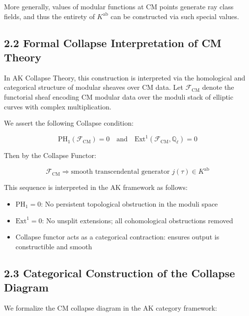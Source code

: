 \documentclass[11pt]{article}
\begin{document}
More generally, values of modular functions at CM points generate ray class fields, and thus the entirety of \( K^{\mathrm{ab}} \) can be constructed via such special values.

\subsection{2.2 Formal Collapse Interpretation of CM Theory}

In AK Collapse Theory, this construction is interpreted via the homological and categorical structure of modular sheaves over CM data. Let \( \mathcal{F}_{\mathrm{CM}} \) denote the functorial sheaf encoding CM modular data over the moduli stack of elliptic curves with complex multiplication.

We assert the following Collapse condition:

\[
\boxed{
\mathrm{PH}_1(\mathcal{F}_{\mathrm{CM}}) = 0 \quad \text{and} \quad \mathrm{Ext}^1(\mathcal{F}_{\mathrm{CM}}, \mathbb{Q}_\ell) = 0
}
\]

Then by the Collapse Functor:

\[
\mathcal{F}_{\mathrm{CM}} \Rightarrow \text{smooth transcendental generator } j(\tau) \in K^{\mathrm{ab}}
\]

This sequence is interpreted in the AK framework as follows:
\begin{itemize}
    \item \( \mathrm{PH}_1 = 0 \): No persistent topological obstruction in the moduli space
    \item \( \mathrm{Ext}^1 = 0 \): No unsplit extensions; all cohomological obstructions removed
    \item Collapse functor acts as a categorical contraction: ensures output is constructible and smooth
\end{itemize}

\subsection{2.3 Categorical Construction of the Collapse Diagram}
\label{subsec:categorical-collapse-diagram}

We formalize the CM collapse diagram in the AK category framework:

\begin{center}
\end{center}
\end{document}
